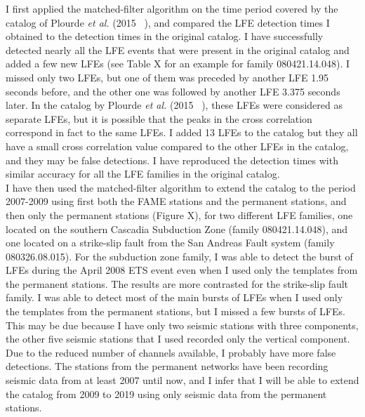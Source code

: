 \documentclass[letterpaper, 12pt]{article}
\begin{document}
I first applied the matched-filter algorithm on the time period covered by the catalog of Plourde \textit{et al.} (2015 ~\cite{PLO_2015}), and compared the LFE detection times I obtained to the detection times in the original catalog. I have successfully detected nearly all the LFE events that were present in the original catalog and added a few new LFEs (see Table X for an example for family 080421.14.048). I missed only two LFEs, but one of them was preceded by another LFE 1.95 seconds before, and the other one was followed by another LFE 3.375 seconds later. In the catalog by Plourde \textit{et al.} (2015 ~\cite{PLO_2015}), these LFEs were considered as separate LFEs, but it is possible that the peaks in the cross correlation correspond in fact to the same LFEs. I added 13 LFEs to the catalog but they all have a small cross correlation value compared to the other LFEs in the catalog, and they may be false detections. I have reproduced the detection times with similar accuracy for all the LFE families in the original catalog. \\

I have then used the matched-filter algorithm to extend the catalog to the period 2007-2009 using first both the FAME stations and the permanent stations, and then only the permanent stations (Figure X), for two different LFE families, one located on the southern Cascadia Subduction Zone (family 080421.14.048), and one located on a strike-slip fault from the San Andreas Fault system (family 080326.08.015). For the subduction zone family, I was able to detect the burst of LFEs during the April 2008 ETS event even when I used only the templates from the permanent stations. The results are more contrasted for the strike-slip fault family. I was able to detect most of the main bursts of LFEs when I used only the templates from the permanent stations, but I missed a few bursts of LFEs. This may be due because I have only two seismic stations with three components, the other five seismic stations that I used recorded only the vertical component. Due to the reduced number of channels available, I probably have more false detections. The stations from the permanent networks have been recording seismic data from at least 2007 until now, and I infer that I will be able to extend the catalog from 2009 to 2019 using only seismic data from the permanent stations.
\end{document}
